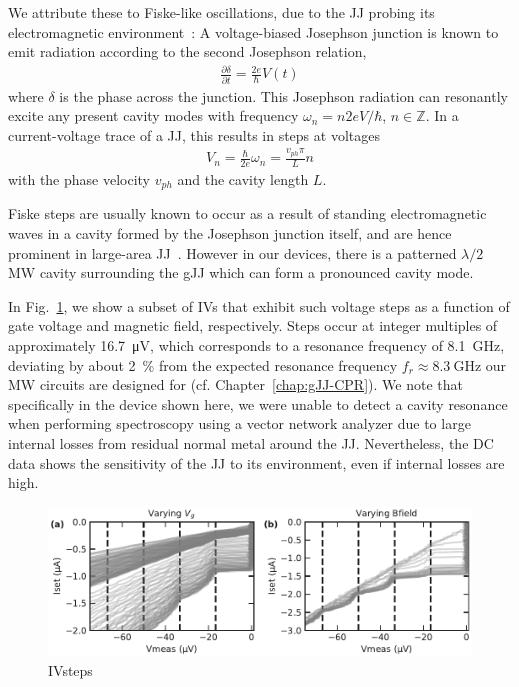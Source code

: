 We attribute these to Fiske-like oscillations, due to the JJ probing its electromagnetic environment~\cite{fiskeTemperatureMagneticField1964,eckSelfDetectionAcJosephson1964,coonJosephsonAcStep1965}:
%
A voltage-biased Josephson junction is known to emit radiation according to the second Josephson relation,
%
\begin{align}
\frac{\partial \delta}{\partial t}=\frac{2e}{\hbar}V(t)
\end{align}
%
where $\delta$ is the phase across the junction.
%
This Josephson radiation can resonantly excite any present cavity modes with frequency $\omega_n=n2eV/\hbar$, $n\in\mathbb{Z}$.
%
In a current-voltage trace of a JJ, this results in steps at voltages
%
\begin{align}
V_n=\frac{\hbar}{2e}\omega_n=\frac{v_{ph}\pi}{L}n
\end{align}
%
with the phase velocity $v_{ph}$ and the cavity length $L$.

Fiske steps are usually known to occur as a result of standing electromagnetic waves in a cavity formed by the Josephson junction itself, and are hence prominent in large-area JJ~\cite{krasnovFiskeStepsIntrinsic1999,kimFiskeStepsStudied2005,yabukiSupercurrentVanWaals2016b,liHighQualityEpitaxialMgB22017}.
%
However in our devices, there is a patterned $\lambda/2$ MW cavity surrounding the gJJ which can form a pronounced cavity mode.


In Fig.~\ref{fig:IVsteps}, we show a subset of IVs that exhibit such voltage steps as a function of gate voltage and magnetic field, respectively.
%
Steps occur at integer multiples of approximately \SI{16.7}{\micro\volt}, which corresponds to a resonance frequency of \SI{8.1}{\giga\hertz}, deviating by about \SI{2}{\percent} from the expected resonance frequency $f_r\approx\SI{8.3}{\giga\hertz}$ our MW circuits are designed for (cf. Chapter~\ref{chap:gJJ-CPR}).
%
We note that specifically in the device shown here, we were unable to detect a cavity resonance when performing spectroscopy using a vector network analyzer due to large internal losses from residual normal metal around the JJ.
%
Nevertheless, the DC data shows the sensitivity of the JJ to its environment, even if internal losses are high.

\begin{figure}
	\centering
	\includegraphics[width=\linewidth]{appendix/gJJ-misc-figs/fig_IVsteps}
	\caption{
		IVsteps
	}
	\label{fig:IVsteps}
\end{figure}


